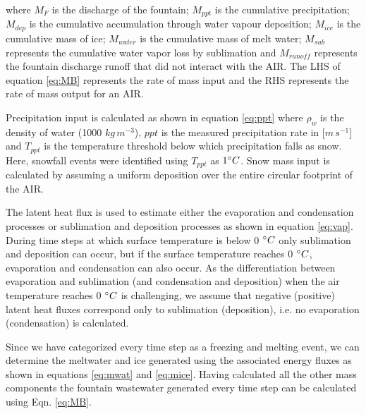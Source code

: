 \documentclass[utf8]{frontiersSCNS} %
\begin{document}
where $M_{F}$ is the discharge of the fountain; $M_{ppt}$ is the cumulative precipitation;  $M_{dep}$ is the cumulative
accumulation through water vapour deposition; $M_{ice}$ is the cumulative mass of ice; $M_{water}$ is the cumulative
mass of melt water; $M_{sub}$ represents the cumulative water vapor loss by sublimation and $M_{runoff}$ represents the
fountain discharge runoff that did not interact with the AIR. The LHS of equation \ref{eq:MB} represents the rate of
mass input and the RHS represents the rate of mass output for an AIR.

Precipitation input is calculated as shown in equation \ref{eq:ppt} where $\rho_{w}$ is the density of water (1000
$kg\,m^{-3}$), $ppt$ is the measured precipitation rate in [$m\,s^{-1}$] and $T_{ppt}$ is the temperature threshold
below which precipitation falls as snow. Here, snowfall events were identified using $T_{ppt}$ as $1 \degree C$. Snow
mass input is calculated by assuming a uniform deposition over the entire circular footprint of the AIR.

The latent heat flux is used to estimate either the evaporation and condensation processes or sublimation and deposition
processes as shown in equation \ref{eq:vap}. During time steps at which surface temperature is below 0 $\degree C$ only
sublimation and deposition can occur, but if the surface temperature reaches 0 $\degree C$, evaporation and condensation
can also occur. As the differentiation between evaporation and sublimation (and condensation and deposition) when the
air temperature reaches 0 $\degree C$ is challenging, we assume that negative (positive) latent heat fluxes correspond
only to sublimation (deposition), i.e. no evaporation (condensation) is calculated.

Since we have categorized every time step as a freezing and melting event, we can determine the meltwater and  ice
generated using the associated energy fluxes as shown in equations \ref{eq:mwat} and \ref{eq:mice}. Having calculated
all the other mass components the fountain wastewater generated every time step can be calculated using Eqn.
\ref{eq:MB}.
\end{document}
